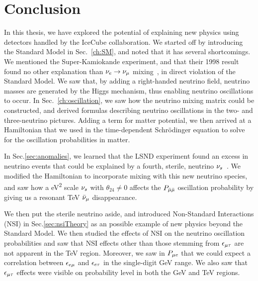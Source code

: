\chapter{Conclusion}\label{ch:conc}
In this thesis, we have explored the potential of explaining new physics using detectors handled by the IceCube collaboration.
We started off by introducing the Standard Model in Sec.~\ref{ch:SM}, and noted that it has several shortcomings. 
We mentioned the Super-Kamiokande experiment, and that their 1998 result found no other explanation than $\nu_e \to \nu_\mu$ mixing~\cite{sk1998}, in direct violation of the Standard Model. 
We saw that, by adding a right-handed neutrino field, neutrino masses are generated by the Higgs mechanism, thus enabling neutrino oscillations to occur. 
In Sec.~\ref{ch:oscillation}, we saw how the neutrino mixing matrix could be constructed, and derived formulas describing neutrino oscillations in the two- and three-neutrino pictures. Adding a term for matter potential,
we then arrived at a Hamiltonian that we used in the time-dependent Schrödinger equation to solve for the oscillation probabilities in matter.

In Sec.\ref{sec:anomalies}, we learned that the LSND experiment found an excess in neutrino events that could be explained by a fourth, sterile, neutrino $\nu_s$~\cite{lsnd}.
We modified the Hamiltonian to incorporate mixing with this new neutrino species, and saw how a \si{\eV^2} scale  $\nu_s$ with $\theta_{24}\neq 0$ affects the $P_{\bar{\mu} \bar{\mu}}$ oscillation probability 
by giving us a resonant \si{\TeV} $\bar{\nu}_\mu$ disappearance.

We then put the sterile neutrino aside, and introduced Non-Standard Interactions (NSI) in Sec.\ref{sec:nsiTheory} as an possible example of new physics beyond the Standard Model.
We then studied the effects of NSI on the neutrino oscillation probabilities and saw that NSI effects other than those stemming from $\epsilon_{\mu\tau}$ are not apparent in the \si{\TeV} region.
Moreover, we saw in $P_{\mu e}$ that we could expect a correlation between $\epsilon_{e\mu}$ and $\epsilon_{e\tau}$ in the single-digit \si{\GeV} range.
We also saw that $\epsilon_{\mu\tau}$ effects were visible on probability level in both the \si{\GeV} and \si{\TeV} regions.

